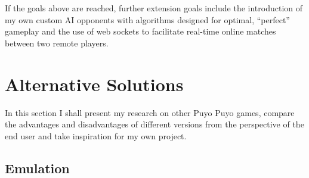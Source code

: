 \documentclass{report}
\begin{document}
If the goals above are reached, further extension goals include the introduction of my own custom AI opponents with algorithms designed for optimal, “perfect” gameplay and the use of web sockets to facilitate real-time online matches between two remote players.

\section{Alternative Solutions}

In this section I shall present my research on other Puyo Puyo games, compare the advantages and disadvantages of different versions from the perspective of the end user and take inspiration for my own project.

\subsection{Emulation}
\end{document}
